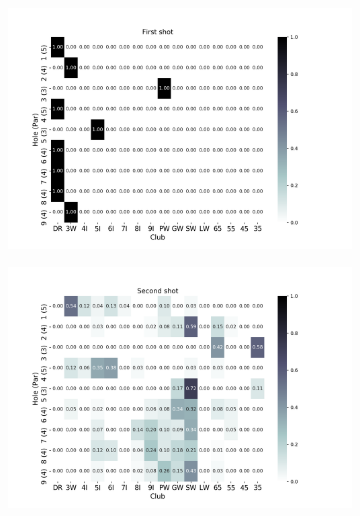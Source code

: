 \documentclass{kththesis}
\begin{document}
\begin{figure}
    \centering
    \begin{subfigure}{\textwidth}
    \centering
    \includegraphics[height=0.3\textheight]{AgentClubChoices/MPDQN_Ullna_Club_Choices_First_Shot.png} 
    \end{subfigure}
    \begin{subfigure}{\textwidth}
    \centering
    \includegraphics[height=0.3\textheight]{AgentClubChoices/MPDQN_Ullna_Club_Choices_Second_Shot.png} 
    \end{subfigure}
    \begin{subfigure}{\textwidth}
    \centering

\end{subfigure}
\end{figure}
\end{document}
